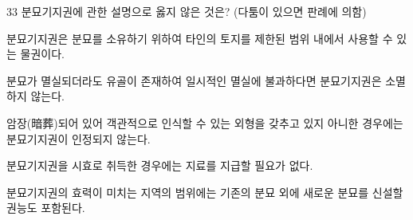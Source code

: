 \begin{question}{33}
분묘기지권에 관한 설명으로 옳지 않은 것은? (다툼이 있으면 판례에 의함)
\begin{choices}
  \item 분묘기지권은 분묘를 소유하기 위하여 타인의 토지를 제한된 범위 내에서 사용할 수 있는 물권이다.
  \item 분묘가 멸실되더라도 유골이 존재하여 일시적인 멸실에 불과하다면 분묘기지권은 소멸하지 않는다.
  \item 암장(暗葬)되어 있어 객관적으로 인식할 수 있는 외형을 갖추고 있지 아니한 경우에는 분묘기지권이 인정되지 않는다.
  \item 분묘기지권을 시효로 취득한 경우에는 지료를 지급할 필요가 없다.
  \item 분묘기지권의 효력이 미치는 지역의 범위에는 기존의 분묘 외에 새로운 분묘를 신설할 권능도 포함된다.
\end{choices}
\end{question}
